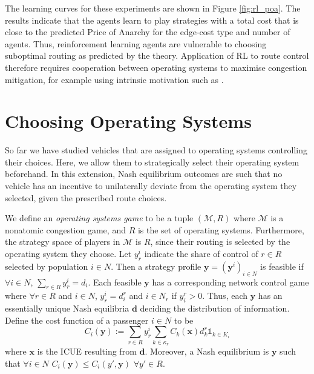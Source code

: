 \documentclass{article}
\begin{document}
 The learning curves for these experiments are shown in Figure \ref{fig:rl_poa}. The results indicate that the agents learn to play strategies with a total cost that is close to the predicted Price of Anarchy for the edge-cost type and number of agents. Thus, reinforcement learning agents are vulnerable to choosing suboptimal routing as predicted by the theory. Application of RL to route control therefore requires cooperation between operating systems to maximise congestion mitigation, for example using intrinsic motivation such as \cite{Jaques2019,Roman2020}. 
    
\section{Choosing Operating Systems} \label{sec:osg}
    So far we have studied vehicles that are assigned to operating systems controlling their choices. Here, we allow them to strategically select their operating system beforehand. In this extension, Nash equilibrium outcomes are such that no vehicle has an incentive to unilaterally deviate from the operating system they selected, given the prescribed route choices. 
    
    
   We define an \textit{operating systems game} to be a tuple $(\mathcal{M}, R)$ where $\mathcal{M}$ is a nonatomic congestion game, and $R$ is the set of operating systems. Furthermore, the strategy space of players in $\mathcal{M}$ is $R$, since their routing is selected by the operating system they choose.
   Let $y^i_r$ indicate the share of control of $r \in R$ selected by population $i \in N$. Then a strategy profile $\bm{y}=(\bm{y}^i)_{i \in N}$ is feasible if $\forall i \in N$, $\sum_{r \in R} y^i_r = d_i$. Each feasible $\bm{y}$ has a corresponding network control game where $\forall r \in R$ and $i \in N$, $y^i_r = d^r_i$ and $i \in N_r$ if $y_i^r>0$. Thus, each $\bm{y}$ has an essentially unique Nash equilibria $\bm{d}$ deciding the distribution of information.
   Define the cost function of a passenger $i \in N$ to be 
   \[C_i(\bm{y}):= \sum_{r \in R} y^i_r \sum_{k \in \kappa_r} C_k(\bm{x})d^r_k \mathds{1}_{k \in K_i}\]
   where $\bm{x}$ is the ICUE resulting from $\bm{d}$. Moreover, a Nash equilibrium is $\bm{y}$ such that  $\forall i \in N$ $C_i(\bm{y}) \leq C_i(y', \bm{y})$ $\forall y' \in R$. 
   
\end{document}
